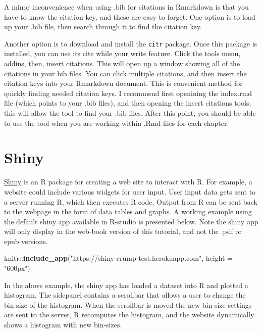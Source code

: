\documentclass[]{book}
\newenvironment{Shaded}{\begin{snugshade}}{\end{snugshade}}
\newcommand{\KeywordTok}[1]{\textcolor[rgb]{0.13,0.29,0.53}{\textbf{{#1}}}}
\newcommand{\DataTypeTok}[1]{\textcolor[rgb]{0.13,0.29,0.53}{{#1}}}
\newcommand{\StringTok}[1]{\textcolor[rgb]{0.31,0.60,0.02}{{#1}}}
\newcommand{\NormalTok}[1]{{#1}}
\theoremstyle{definition}
\theoremstyle{definition}
\theoremstyle{definition}
\theoremstyle{remark}
\begin{document}
A minor inconvenience when using .bib for citations in Rmarkdown is that
you have to know the citation key, and these are easy to forget. One
option is to load up your .bib file, then search through it to find the
citation key.

Another option is to download and install the \texttt{citr} package.
Once this package is installed, you can use its cite while your write
feature. Click the tools menu, addins, then, insert citations. This will
open up a window showing all of the citations in your bib files. You can
click multiple citations, and then insert the citation keys into your
Rmarkdown document. This is convenient method for quickly finding needed
citation keys. I recommend first openining the index.rmd file (which
points to your .bib files), and then opening the insert citations tools;
this will allow the tool to find your .bib files. After this point, you
should be able to use the tool when you are working within .Rmd files
for each chapter.

\chapter{Shiny}\label{shiny}

\href{https://shiny.rstudio.com}{Shiny} is an R package for creating a
web site to interact with R. For example, a website could include
various widgets for user input. User input data gets sent to a server
running R, which then executes R code. Output from R can be sent back to
the webpage in the form of data tables and graphs. A working example
using the default shiny app available in R-studio is presented below.
Note the shiny app will only display in the web-book version of this
tutorial, and not the .pdf or epub versions.

\begin{Shaded}
\begin{Highlighting}[]
\NormalTok{knitr::}\KeywordTok{include_app}\NormalTok{(}\StringTok{"https://shiny-crump-test.herokuapp.com"}\NormalTok{, }
  \DataTypeTok{height =} \StringTok{"600px"}\NormalTok{)}
\end{Highlighting}
\end{Shaded}

In the above example, the shiny app has loaded a dataset into R and
plotted a histogram. The sidepanel contains a scrollbar that allows a
user to change the bin-size of the histogram. When the scrollbar is
moved the new bin-size settings are sent to the server, R recomputes the
histogram, and the website dynamically shows a histogram with new
bin-sizes.
\end{document}
